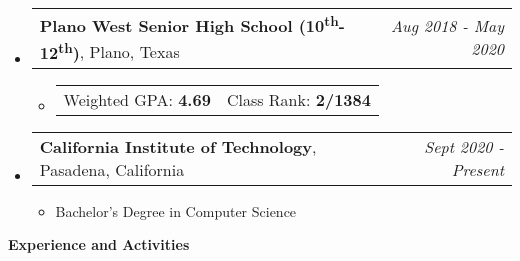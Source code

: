 \documentclass[letterpaper,11pt]{article}
\makeatletter
\newcommand{\resitem}[1]{\item #1 \vspace{-3pt}}
\newcommand{\resheading}[1]{{\large \colorbox{mygrey}{\begin{minipage}{\textwidth}{\textbf{#1 \vphantom{p\^{E}}}}\end{minipage}}}}
\newcommand{\edusubheading}[3]{
	\begin{tabular*}{7.0in}{l@{\extracolsep{\fill}}r}
		\textbf{#1}, #2 & \textit{#3} \\
\end{tabular*}\vspace{-6pt}}
\makeatother
\begin{document}
\begin{itemize}
\item
	\edusubheading{Plano West Senior High School (10\textsuperscript{th}-12\textsuperscript{th})}{Plano, Texas}{Aug 2018 - May 2020}
		\begin{itemize}
			\resitem{\begin{tabular}{p{2.5in} p{2.5in}}
							Weighted GPA: \textbf{4.69} & Class Rank: \textbf{2/1384}\\
						\end{tabular}}
		\end{itemize}

\item
	\edusubheading{California Institute of Technology}{Pasadena, California}{Sept 2020 - Present}
		\begin{itemize}
			\resitem{Bachelor's Degree in Computer Science}
		\end{itemize}

\end{itemize}

\vspace{6pt}

\resheading{Experience and Activities}
\end{document}
